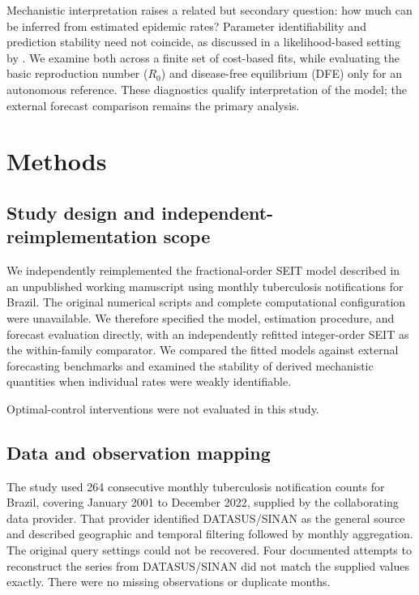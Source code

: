\documentclass[pdflatex,sn-mathphys-ay]{sn-jnl}
\begin{document}
Mechanistic interpretation raises a related but secondary question: how much can be inferred from estimated epidemic rates? Parameter identifiability and prediction stability need not coincide, as discussed in a likelihood-based setting by \citet{simpson2024}. We examine both across a finite set of cost-based fits, while evaluating the basic reproduction number ($R_0$) and disease-free equilibrium (DFE) only for an autonomous reference. These diagnostics qualify interpretation of the model; the external forecast comparison remains the primary analysis.

\section{Methods}

\subsection{Study design and independent-reimplementation scope}

We independently reimplemented the fractional-order SEIT model described in an unpublished working manuscript using monthly tuberculosis notifications for Brazil. The original numerical scripts and complete computational configuration were unavailable. We therefore specified the model, estimation procedure, and forecast evaluation directly, with an independently refitted integer-order SEIT as the within-family comparator. We compared the fitted models against external forecasting benchmarks and examined the stability of derived mechanistic quantities when individual rates were weakly identifiable.



Optimal-control interventions were not evaluated in this study.

\subsection{Data and observation mapping}

The study used 264 consecutive monthly tuberculosis notification counts for Brazil, covering January 2001 to December 2022, supplied by the collaborating data provider. That provider identified DATASUS/SINAN as the general source and described geographic and temporal filtering followed by monthly aggregation. The original query settings could not be recovered. Four documented attempts to reconstruct the series from DATASUS/SINAN did not match the supplied values exactly. There were no missing observations or duplicate months.
\end{document}
